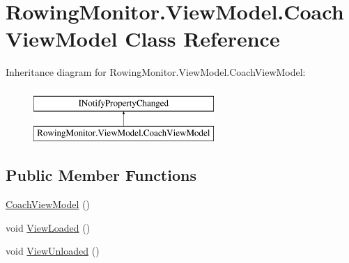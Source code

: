 \hypertarget{class_rowing_monitor_1_1_view_model_1_1_coach_view_model}{}\section{Rowing\+Monitor.\+View\+Model.\+Coach\+View\+Model Class Reference}
\label{class_rowing_monitor_1_1_view_model_1_1_coach_view_model}
Inheritance diagram for Rowing\+Monitor.\+View\+Model.\+Coach\+View\+Model\+:\begin{figure}[H]
\begin{center}
\leavevmode
\includegraphics[height=2.000000cm]{class_rowing_monitor_1_1_view_model_1_1_coach_view_model}
\end{center}
\end{figure}
\subsection*{Public Member Functions}
\begin{DoxyCompactItemize}
\item 
\hyperlink{class_rowing_monitor_1_1_view_model_1_1_coach_view_model_a083e3b3fd6d99f73f46dfffd5a65f40a}{Coach\+View\+Model} ()
\item 
void \hyperlink{class_rowing_monitor_1_1_view_model_1_1_coach_view_model_aae36b0bb86b83b32b3cfe576fd917e7f}{View\+Loaded} ()
\item 
void \hyperlink{class_rowing_monitor_1_1_view_model_1_1_coach_view_model_a65df739b4a9b22d3241cf7afd18c0256}{View\+Unloaded} ()
\end{DoxyCompactItemize}
